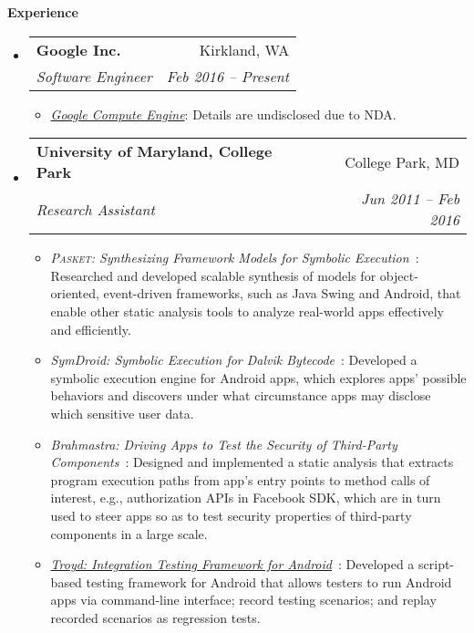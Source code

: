 \documentclass[letterpaper,11pt]{article}
\makeatletter
\newcommand{\resheading}[1]{{\large \colorbox{mygrey}{\begin{minipage}{\textwidth}{\textbf{#1 \vphantom{p\^{E}}}}\end{minipage}}}}
\newcommand{\ressubheading}[4]{
\begin{tabular*}{6.5in}{l@{\extracolsep{\fill}}r}
    \textbf{#1} & #2 \\
    \textit{#3} & \textit{#4} \\
\end{tabular*}\vspace{-6pt}}
\makeatother
\begin{document}
\resheading{Experience}
  \begin{itemize}
    \item
      \ressubheading{{Google Inc.}}{Kirkland, WA}{Software Engineer}{Feb 2016 -- Present}
        {
\small
        \begin{itemize}
\item\emph{\href{https://cloud.google.com/compute/}{Google Compute Engine}}:
Details are undisclosed due to NDA.
        \end{itemize}
        }
    \item
      \ressubheading{{University of Maryland, College Park}}{College Park, MD}{Research Assistant}{Jun 2011 -- Feb 2016}
        {
\small
        \begin{itemize}
\item\emph{\textsc{Pasket}: Synthesizing Framework Models for Symbolic Execution}~\cite{ac-study, icse16, fse15, cav15, popl14, jsk-tr}:
Researched and developed scalable synthesis of models for object-oriented,
event-driven frameworks, such as Java Swing and Android,
that enable other static analysis tools
to analyze real-world apps effectively and efficiently.

\item\emph{SymDroid: Symbolic Execution for Dalvik Bytecode}~\cite{esorics15, esorics15-tr, symdroid}:
Developed a symbolic execution engine for Android apps,
which explores apps' possible behaviors and
discovers under what circumstance apps may disclose which sensitive user data.

\item\emph{Brahmastra: Driving Apps to Test the Security of Third-Party Components}~\cite{security14}:
Designed and implemented a static analysis that extracts program execution paths
from app's entry points to method calls of interest, e.g., authorization APIs
in Facebook SDK, which are in turn used to steer apps so as to test
security properties of third-party components in a large scale.

\item\emph{\href{https://github.com/plum-umd/troyd}{Troyd: Integration Testing Framework for Android}}~\cite{troyd}:
Developed a script-based testing framework for Android
that allows testers to run Android apps via command-line interface;
record testing scenarios; and replay recorded scenarios as regression tests.


\end{itemize}}
\end{itemize}
\end{document}
